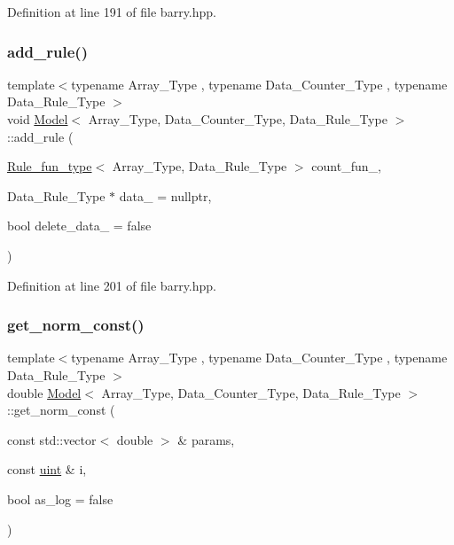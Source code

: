 Definition at line 191 of file barry.\+hpp.

\mbox{\label{classbarry_1_1_model_af3a1a343dfff4f40443bee4ddf76a0ba}} 
\subsubsection{\texorpdfstring{add\+\_\+rule()}{add\_rule()}\hspace{0.1cm}{\footnotesize\ttfamily [3/3]}}
{\footnotesize\ttfamily template$<$typename Array\+\_\+\+Type , typename Data\+\_\+\+Counter\+\_\+\+Type , typename Data\+\_\+\+Rule\+\_\+\+Type $>$ \\
void \hyperlink{classbarry_1_1_model}{Model}$<$ Array\+\_\+\+Type, Data\+\_\+\+Counter\+\_\+\+Type, Data\+\_\+\+Rule\+\_\+\+Type $>$\+::add\+\_\+rule (\begin{DoxyParamCaption}\item[{\hyperlink{namespacebarry_aefd7e6d4ba228e2ce1074d075c512178}{Rule\+\_\+fun\+\_\+type}$<$ Array\+\_\+\+Type, Data\+\_\+\+Rule\+\_\+\+Type $>$}]{count\+\_\+fun\+\_\+,  }\item[{Data\+\_\+\+Rule\+\_\+\+Type $\ast$}]{data\+\_\+ = {\ttfamily nullptr},  }\item[{bool}]{delete\+\_\+data\+\_\+ = {\ttfamily false} }\end{DoxyParamCaption})\hspace{0.3cm}{\ttfamily [inline]}}



Definition at line 201 of file barry.\+hpp.

\mbox{\label{classbarry_1_1_model_a8de55fd86cdca46936e455721754a2af}} 
\subsubsection{\texorpdfstring{get\+\_\+norm\+\_\+const()}{get\_norm\_const()}}
{\footnotesize\ttfamily template$<$typename Array\+\_\+\+Type , typename Data\+\_\+\+Counter\+\_\+\+Type , typename Data\+\_\+\+Rule\+\_\+\+Type $>$ \\
double \hyperlink{classbarry_1_1_model}{Model}$<$ Array\+\_\+\+Type, Data\+\_\+\+Counter\+\_\+\+Type, Data\+\_\+\+Rule\+\_\+\+Type $>$\+::get\+\_\+norm\+\_\+const (\begin{DoxyParamCaption}\item[{const std\+::vector$<$ double $>$ \&}]{params,  }\item[{const \hyperlink{namespacebarry_a11dfc53ddb4672278319aa04f1e09a6c}{uint} \&}]{i,  }\item[{bool}]{as\+\_\+log = {\ttfamily false} }\end{DoxyParamCaption})\hspace{0.3cm}{\ttfamily [inline]}}



